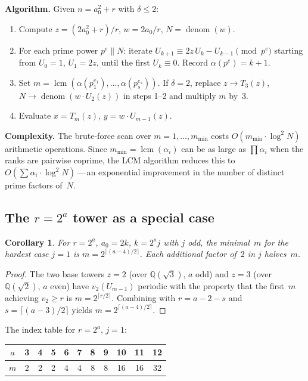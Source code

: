 \documentclass[11pt]{article}
\newtheorem{corollary}[theorem]{Corollary}
\theoremstyle{definition}
\theoremstyle{remark}
\begin{document}
\textbf{Algorithm.}\;
Given $n = a_0^2 + r$ with $\delta \le 2$:
\begin{enumerate}
\item Compute $z = (2a_0^2 + r)/r$, \; $w = 2a_0/r$, \; $N = \operatorname{denom}(w)$.
\item For each prime power $p^e \| N$: iterate
  $U_{k+1} \equiv 2z\,U_k - U_{k-1} \pmod{p^e}$ starting from
  $U_0 = 1$, $U_1 = 2z$, until the first $U_k \equiv 0$.
  Record $\alpha(p^e) = k + 1$.
\item Set $m = \operatorname{lcm}(\alpha(p_1^{e_1}), \ldots, \alpha(p_s^{e_s}))$.
  If $\delta = 2$, replace $z \to T_3(z)$, $N \to \operatorname{denom}(w \cdot U_2(z))$
  in steps 1--2 and multiply $m$ by~$3$.
\item Evaluate $x = T_m(z)$, \; $y = w \cdot U_{m-1}(z)$.
\end{enumerate}

\textbf{Complexity.}\;
The brute-force scan over $m = 1, \ldots, m_{\min}$ costs
$O(m_{\min} \cdot \log^2 N)$ arithmetic operations.
Since $m_{\min} = \operatorname{lcm}(\alpha_i)$ can be as large as
$\prod \alpha_i$ when the ranks are pairwise coprime,
the LCM algorithm reduces this to $O(\sum \alpha_i \cdot \log^2 N)$\,---\,an
exponential improvement in the number of distinct prime factors of~$N$.

\subsection{The $r = 2^a$ tower as a special case}

\begin{corollary}\label{cor:2tower}
For $r = 2^a$, $a_0 = 2k$, $k = 2^s j$ with $j$ odd,
the minimal~$m$ for the hardest case $j = 1$ is
$m = 2^{\lceil(a-4)/2\rceil}$.
Each additional factor of~$2$ in $j$ halves~$m$.
\end{corollary}

\begin{proof}
The two base towers $z = 2$
(over $\mathbb{Q}(\sqrt{3})$, $a$ odd) and $z = 3$
(over $\mathbb{Q}(\sqrt{2})$, $a$ even) have
$v_2(U_{m-1})$ periodic with the property that the first~$m$
achieving $v_2 \ge r$ is $m = 2^{\lceil r/2 \rceil}$.
Combining with $r = a - 2 - s$ and $s = \lceil(a-3)/2\rceil$ yields
$m = 2^{\lceil(a-4)/2\rceil}$.
\end{proof}

The index table for $r = 2^a$, $j = 1$:
\begin{center}
\begin{tabular}{ccccccccccc}
\toprule
$a$ & 3 & 4 & 5 & 6 & 7 & 8 & 9 & 10 & 11 & 12 \\
\midrule
$m$ & 2 & 2 & 2 & 4 & 4 & 8 & 8 & 16 & 16 & 32 \\
\bottomrule
\end{tabular}
\end{center}
\end{document}
